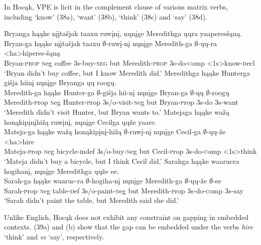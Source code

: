 \documentclass[output=paper]{LSP/langsci}
\begin{document}
In Hocąk, VPE is licit in the complement clause of various matrix verbs, including `know' (38a), `want' (38b), `think' (38c) and `say' (38d).


\begin{exe}
\ex
\begin{xlist}
\ex
\glll Bryanga hąąke {nįįtašjak taaxu} ruwįnį, nųnįge Meredithga ųųra yaaperesšąną.\\
Bryan-ga hąąke {nįįtašjak taaxu} $\emptyset$-ruwį-nį nųnįge Meredith-ga $\emptyset$-ųų-ra <ha>hiperes-šąną\\
Bryan-\textsc{prop} {\textsc neg} coffee {\textsc 3s}-buy-\textsc{neg} but Meredith-\textsc{prop} {\textsc 3s}-do-{\textsc comp} <{\textsc 1s}>know-{\textsc decl}\\
\trans `Bryan didn't buy coffee, but I know Meredith did.'
\ex
\glll Meredithga hąąke Hunterga {gišja hiinį} nųnįge Bryanga ųų roogų.\\
Meredith-ga hąąke Hunter-ga $\emptyset$-{gišja hii-nį} nųnįge Bryan-ga $\emptyset$-ųų $\emptyset$-roogų\\
Meredith-{\textsc prop} {\textsc neg} Hunter-{\textsc prop} {\textsc 3s/o}-visit-{\textsc neg} but Bryan-{\textsc prop} {\textsc 3s}-do {\textsc 3s}-want\\
\trans `Meredith didn't visit Hunter, but Bryan wants to.'
\ex
\glll Matejaga hąąke {wažą honąkipįnįhižą} ruwįnį, nųnįge Cecilga ųųže yaare.\\
Mateja-ga hąąke {wažą honąkipįnį-hižą} $\emptyset$-ruwį-nį nųnįge Cecil-ga $\emptyset$-ųų-že <ha>hire\\
Mateja-{\textsc prop} {\textsc neg} bicycle-{\textsc indef} {\textsc 3s/o}-buy-{\textsc neg} but Cecil-{\textsc prop} {\textsc 3s}-do-{\textsc comp} <{\textsc 1s}>think\\
\trans `Mateja didn't buy a bicycle, but I think Cecil did.'
\ex
\glll Sarahga hąąke waarucra hogihanį, nųnįge Meredithga ųųže ee.\\
Sarah-ga hąąke waaruc-ra $\emptyset$-hogiha-nį nųnįge Meredith-ga $\emptyset$-ųų-že $\emptyset$-ee\\
Sarah-{\textsc prop} {\textsc neg} table-{\textsc def} {\textsc 3s/o}-paint-{\textsc neg} but Meredith-{\textsc prop} {\textsc 3s}-do-{\textsc comp} {\textsc 3s}-say\\
\trans `Sarah didn't paint the table, but Meredith said she did.'
\end{xlist}
\end{exe}

Unlike English, Hocąk does not exhibit any constraint on gapping in embedded contexts. (39a) and (b) show that the gap can be embedded under the verbs \emph{hire} `think' and \emph{ee} `say', respectively.
\end{document}
